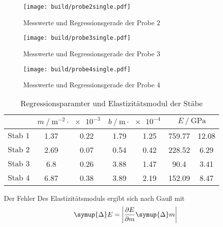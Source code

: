 \begin{figure}
  \centering
  \caption{Messwerte und Regressionsgerade der Probe 2}
  \label{fig:probe2single}
  \texttt{[image: build/probe2single.pdf]}
\end{figure}
\begin{figure}
  \centering
  \caption{Messwerte und Regressionsgerade der Probe 3}
  \label{fig:probe3single}
  \texttt{[image: build/probe3single.pdf]}
\end{figure}
\begin{figure}
  \centering
  \caption{Messwerte und Regressionsgerade der Probe 4}
  \label{fig:probe4single}
  \texttt{[image: build/probe4single.pdf]}
\end{figure}
\begin{table}
  \centering
  \caption{Regressionsparamter und Elastizitätsmodul der Stäbe}
  \label{tab:regression}
  \begin{tabular} {S[table-format=3.0] 
    S[table-format=1.2] @{${}\pm{}$} S[table-format=1.2]
    S[table-format=1.2] @{${}\pm{}$} S[table-format=1.2] 
    S[table-format=3.2] @{${}\pm{}$} S[table-format=2.2]}
  \toprule
  &  & 
     & 
    \\
  \midrule
  {$\text{Stab 1}$}  & 1.37 & 0.22 & 1.79 & 1.25 & 759.77 & 12.08\\
  {$\text{Stab 2}$}  & 2.69 & 0.07 & 0.54 & 0.42 & 228.52 & 6.29  \\
  {$\text{Stab 3}$}  & 6.8  & 0.26 & 3.88 & 1.47 & 90.4   & 3.41 \\ 
  {$\text{Stab 4}$}  & 6.87 & 0.38 & 3.89 & 2.19 & 152.09 & 8.47 \\
  \bottomrule
  \end{tabular}
\end{table}
Der Fehler Des Elastizitätsmoduls ergibt sich nach Gauß mit
\begin{equation}
  \symup{\Delta} E = \left | \frac{\partial E}{\partial m}  \symup{\Delta} m \right | \label{eqn:gauss}
\end{equation}
\FloatBarrier
